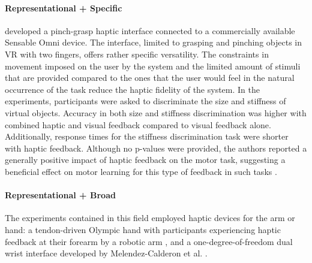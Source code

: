 \paragraph{Representational + Specific} \label{sec:representationalspecific}
\cite{Najdovski2020} developed a pinch-grasp haptic interface connected to a commercially available Sensable Omni device. The interface, limited to grasping and pinching objects in VR with two fingers, offers rather specific versatility. The constraints in movement imposed on the user by the system and the limited amount of stimuli that are provided compared to the ones that the user would feel in the natural occurrence of the task reduce the haptic fidelity of the system. 
In the experiments, participants were asked to discriminate the size and stiffness of virtual objects. Accuracy in both size and stiffness discrimination was higher with combined haptic and visual feedback compared to visual feedback alone. Additionally, response times for the stiffness discrimination task were shorter with haptic feedback. Although no p-values were provided, the authors reported a generally positive impact of haptic feedback on the motor task, suggesting a beneficial effect on motor learning for this type of feedback in such tasks \cite{Najdovski2020}. 

\paragraph{Representational + Broad} \label{sec:representationalbroad}
The experiments contained in this field employed haptic devices for the arm or hand: a tendon-driven Olympic hand with participants experiencing haptic feedback at their forearm by a robotic arm \cite{Chappell2022}, and a one-degree-of-freedom dual wrist interface \cite{Perez2023} developed by Melendez-Calderon et al. \cite{Melendez-Calderon2011Hi5:Control}.

